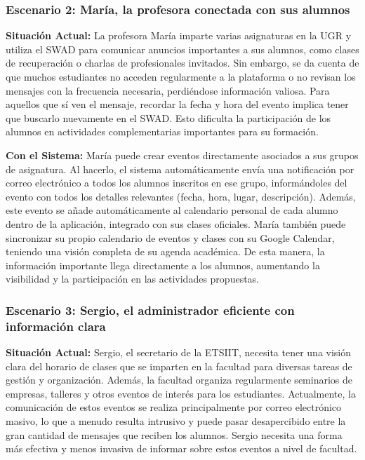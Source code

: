 \subsubsection*{Escenario 2: María, la profesora conectada con sus alumnos}

\textbf{Situación Actual:} La profesora María imparte varias asignaturas en la UGR y utiliza el SWAD para comunicar anuncios importantes a sus alumnos, como clases de recuperación o charlas de profesionales invitados. Sin embargo, se da cuenta de que muchos estudiantes no acceden regularmente a la plataforma o no revisan los mensajes con la frecuencia necesaria, perdiéndose información valiosa. Para aquellos que sí ven el mensaje, recordar la fecha y hora del evento implica tener que buscarlo nuevamente en el SWAD. Esto dificulta la participación de los alumnos en actividades complementarias importantes para su formación.

\textbf{Con el Sistema:} María puede crear eventos directamente asociados a sus grupos de asignatura. Al hacerlo, el sistema automáticamente envía una notificación por correo electrónico a todos los alumnos inscritos en ese grupo, informándoles del evento con todos los detalles relevantes (fecha, hora, lugar, descripción). Además, este evento se añade automáticamente al calendario personal de cada alumno dentro de la aplicación, integrado con sus clases oficiales. María también puede sincronizar su propio calendario de eventos y clases con su Google Calendar, teniendo una visión completa de su agenda académica. De esta manera, la información importante llega directamente a los alumnos, aumentando la visibilidad y la participación en las actividades propuestas.

\subsubsection*{Escenario 3: Sergio, el administrador eficiente con información clara}

\textbf{Situación Actual:} Sergio, el secretario de la ETSIIT, necesita tener una visión clara del horario de clases que se imparten en la facultad para diversas tareas de gestión y organización. Además, la facultad organiza regularmente seminarios de empresas, talleres y otros eventos de interés para los estudiantes. Actualmente, la comunicación de estos eventos se realiza principalmente por correo electrónico masivo, lo que a menudo resulta intrusivo y puede pasar desapercibido entre la gran cantidad de mensajes que reciben los alumnos. Sergio necesita una forma más efectiva y menos invasiva de informar sobre estos eventos a nivel de facultad.

